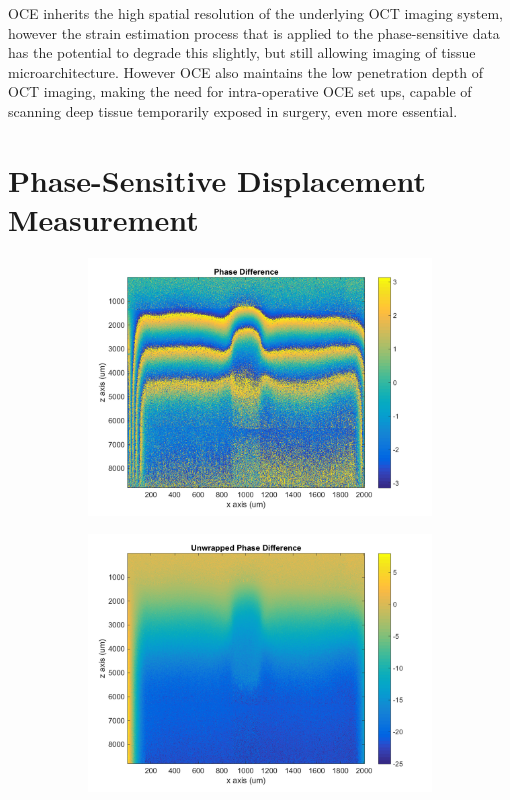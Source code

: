 OCE inherits the high spatial resolution of the underlying OCT imaging system, however the strain estimation process that is applied to the phase-sensitive data has the potential to degrade this slightly, but still allowing imaging of tissue microarchitecture. However OCE also maintains the low penetration depth of OCT imaging, making the need for intra-operative OCE set ups, capable of scanning deep tissue temporarily exposed in surgery, even more essential. 

\section{Phase-Sensitive Displacement Measurement}

\begin{figure}
	\centering
	\begin{subfigure}{0.45\textwidth}
		\centering
		\includegraphics[width=\textwidth]{figures/phase_difference.png}
	\end{subfigure}
	\quad
	\begin{subfigure}{0.45\textwidth}
		\centering
		\includegraphics[width=\textwidth]{figures/unwrapped_phase.png}

\end{subfigure}
\end{figure}
